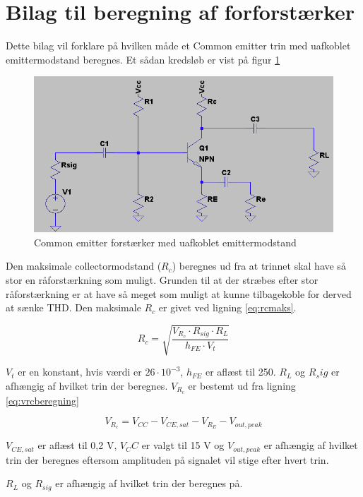\section{Bilag til beregning af forforstærker}

Dette bilag vil forklare på hvilken måde et Common emitter trin med uafkoblet emittermodstand beregnes. Et sådan kredsløb er vist på figur \ref{fig:commonemitter}

\begin{figure}[h]
\centering
\includegraphics[scale=.6]{teknisk/forforstaerker/bilag/commonemitterfigur.png}
\caption{Common emitter forstærker med uafkoblet emittermodstand}
\label{fig:commonemitter}
\end{figure}

Den maksimale collectormodstand ($R_c$) beregnes ud fra at trinnet skal have så stor en råforstærkning som muligt. Grunden til at der stræbes efter stor råforstærkning er at have så meget som muligt at kunne tilbagekoble for derved at sænke THD. Den maksimale $R_c$ er givet ved ligning \ref{eq:rcmaks}.

\begin{equation}
R_c = \sqrt{\frac{ V_{R_c} \cdot R_{sig} \cdot R_L } { h_{FE} \cdot V_t}}
\label{eq:rcmaks}
\end{equation}

$V_t$ er en konstant, hvis værdi er $26 \cdot 10^{-3}$, $h_{FE}$ er aflæst til 250. $R_L$ og $R_sig$ er afhængig af hvilket trin der beregnes. $V_{R_c}$ er bestemt ud fra ligning \ref{eq:vrcberegning}

\begin{equation}
V_{R_c} = V_{CC} - V_{CE,sat} - V_{R_E} - V_{out,peak}
\label{eq:vrcberegning}
\end{equation}
 
$V_{CE,sat}$ er aflæst til 0,2 V, $V_CC$ er valgt til 15 V og $V_{out,peak}$ er afhængig af hvilket trin der beregnes eftersom amplituden på signalet vil stige efter hvert trin.






$R_L$ og $R_{sig}$ er afhængig af hvilket trin der beregnes på. 